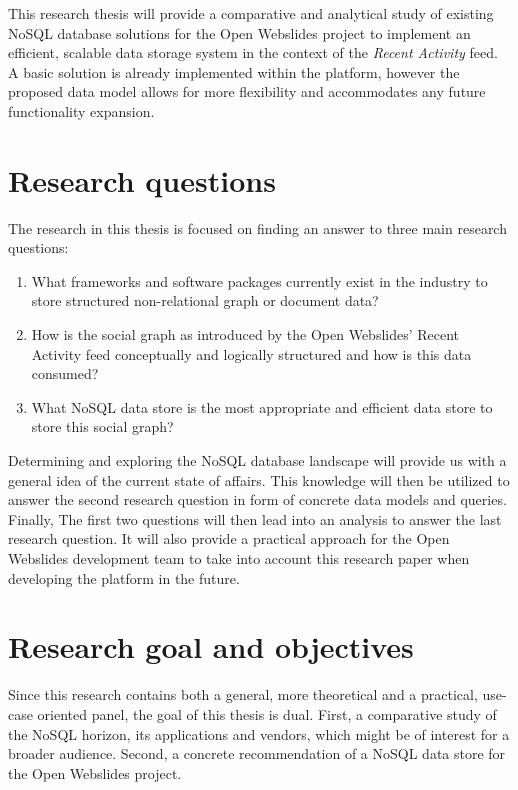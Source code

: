 This research thesis will provide a comparative and analytical study of existing NoSQL database solutions for the Open Webslides project to implement an efficient, scalable data storage system in the context of the \textit{Recent Activity} feed.
A basic solution is already implemented within the platform, however the proposed data model allows for more flexibility and accommodates any future functionality expansion.

\section{Research questions}
\label{sec:research-questions}

The research in this thesis is focused on finding an answer to three main research questions:

\begin{enumerate}
  \item What frameworks and software packages currently exist in the industry to store structured non-relational graph or document data?
  \item How is the social graph as introduced by the Open Webslides' Recent Activity feed conceptually and logically structured and how is this data consumed?
  \item What NoSQL data store is the most appropriate and efficient data store to store this social graph?
\end{enumerate}

Determining and exploring the NoSQL database landscape will provide us with a general idea of the current state of affairs.
This knowledge will then be utilized to answer the second research question in form of concrete data models and queries.
Finally, The first two questions will then lead into an analysis to answer the last research question.
It will also provide a practical approach for the Open Webslides development team to take into account this research paper when developing the platform in the future.

\section{Research goal and objectives}
\label{sec:research-goal-and-objectives}

Since this research contains both a general, more theoretical and a practical, use-case oriented panel, the goal of this thesis is dual.
First, a comparative study of the NoSQL horizon, its applications and vendors, which might be of interest for a broader audience.
Second, a concrete recommendation of a NoSQL data store for the Open Webslides project.

